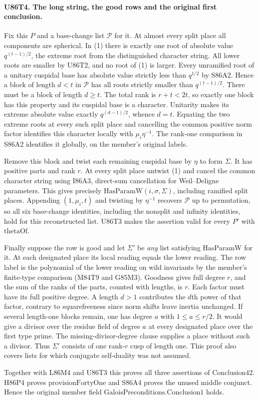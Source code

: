 \paragraph{U86T4. The long string, the good rows and the original first conclusion.}
Fix this $P$ and a base-change list $\mathcal P$ for it.
At almost every split place all components are spherical. In (1)
there is exactly one root of absolute value $q^{(t-1)/2}$, the
extreme root from the distinguished character string. All lower
roots are smaller by U86T2, and no root of (1) is larger.
Every unramified root of a unitary cuspidal base has absolute value
strictly less than $q^{1/2}$ by S86A2. Hence a block of length
$d<t$ in $\mathcal P$ has all roots strictly smaller than
$q^{(t-1)/2}$. There must be a block of length $d\ge t$.
The total rank is $r+t<2t$, so exactly one block has this property
and its cuspidal base is a character. Unitarity makes its extreme
absolute value exactly $q^{(d-1)/2}$, whence $d=t$. Equating the
two extreme roots at every such split place and cancelling the
common positive norm factor identifies this character locally with
$\mu_i\eta^{-1}$. The rank-one comparison in S86A2 identifies it
globally, on the member's original labels.

Remove this block and twist each remaining cuspidal base by $\eta$
to form $\Sigma$. It has positive parts and rank $r$. At every
split place untwist (1) and cancel the common character string
using I86A3, direct-sum cancellation for Weil--Deligne parameters.
This gives precisely $\mathrm{HasParamW}(i,\sigma,\Sigma)$,
including ramified split places. Appending $(1,\mu_i,t)$ and
twisting by $\eta^{-1}$ recovers $\mathcal P$ up to permutation,
so all six base-change identities, including the nonsplit and
infinity identities, hold for this reconstructed list. U86T3
makes the assertion valid for every $P'$ with $\mathrm{thetaOf}$.

Finally suppose the row is good and let $\Sigma'$ be \emph{any}
list satisfying $\mathrm{HasParamW}$ for it. At each designated
place its local reading equals the lower reading. The row label is
the polynomial of the lower reading on wild invariants by the
member's finite-type comparison (M84T9 and G85M3). Goodness gives
full degree $r$, and the sum of the ranks of the parts, counted
with lengths, is $r$. Each factor must have its full positive
degree. A length $d>1$ contributes the $d$th power of that factor,
contrary to squarefreeness since norm shifts leave inertia unchanged.
If several length-one blocks remain, one has degree $a$ with
$1\le a\le r/2$. It would give a divisor over the residue field
of degree $a$ at every designated place over the first type prime.
The missing-divisor-degree clause supplies a place without such
a divisor. Thus $\Sigma'$ consists of one rank-$r$ cusp of length
one. This proof also covers lists for which conjugate self-duality
was not assumed.

Together with L86M4 and U86T3 this proves all three assertions of
$\mathrm{Conclusion42}$. H86P4 proves $\mathrm{provisionFortyOne}$
and S86A4 proves the unused middle conjunct. Hence the original
member field $\mathrm{GaloisPreconditions.Conclusion1}$ holds.
